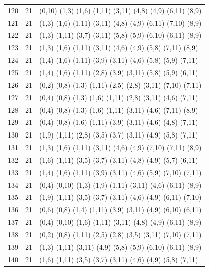 \begin{appendix}
{\begin{longtable}{lll}
    120& 21 & (0,10)  (1,3)   (1,6)   (1,11)  (3,11)  (4,8)   (4,9)   (6,11)  (8,9)\\
    121& 21 & (1,3)   (1,6)   (1,11)  (3,11)  (4,8)   (4,9)   (6,11)  (7,10)  (8,9)\\
    122& 21 & (1,3)   (1,11)  (3,7)   (3,11)  (5,8)   (5,9)   (6,10)  (6,11)  (8,9)\\
    123& 21 & (1,3)   (1,6)   (1,11)  (3,11)  (4,6)   (4,9)   (5,8)   (7,11)  (8,9)\\
    124& 21 & (1,4)   (1,6)   (1,11)  (3,9)   (3,11)  (4,6)   (5,8)   (5,9)   (7,11)\\
    125& 21 & (1,4)   (1,6)   (1,11)  (2,8)   (3,9)   (3,11)  (5,8)   (5,9)   (6,11)\\
    126& 21 & (0,2)   (0,8)   (1,3)   (1,11)  (2,5)   (2,8)   (3,11)  (7,10)  (7,11)\\
    127& 21 & (0,4)   (0,8)   (1,3)   (1,6)   (1,11)  (2,8)   (3,11)  (4,6)   (7,11)\\
    128& 21 & (0,4)   (0,8)   (1,3)   (1,6)   (1,11)  (3,11)  (4,6)   (7,11)  (8,9)\\
    129& 21 & (0,4)   (0,8)   (1,6)   (1,11)  (3,9)   (3,11)  (4,6)   (4,8)   (7,11)\\
    130& 21 & (1,9)   (1,11)  (2,8)   (3,5)   (3,7)   (3,11)  (4,9)   (5,8)   (7,11)\\
    131& 21 & (1,3)   (1,6)   (1,11)  (3,11)  (4,6)   (4,9)   (7,10)  (7,11)  (8,9)\\
    132& 21 & (1,6)   (1,11)  (3,5)   (3,7)   (3,11)  (4,8)   (4,9)   (5,7)   (6,11)\\
    133& 21 & (1,4)   (1,6)   (1,11)  (3,9)   (3,11)  (4,6)   (5,9)   (7,10)  (7,11)\\
    134& 21 & (0,4)   (0,10)  (1,3)   (1,9)   (1,11)  (3,11)  (4,6)   (6,11)  (8,9)\\
    135& 21 & (1,9)   (1,11)  (3,5)   (3,7)   (3,11)  (4,6)   (4,9)   (6,11)  (7,10)\\
    136& 21 & (0,6)   (0,8)   (1,4)   (1,11)  (3,9)   (3,11)  (4,9)   (6,10)  (6,11)\\
    137& 21 & (0,4)   (0,10)  (1,6)   (1,11)  (3,11)  (4,8)   (4,9)   (6,11)  (8,9)\\
    138& 21 & (0,2)   (0,8)   (1,11)  (2,5)   (2,8)   (3,5)   (3,11)  (7,10)  (7,11)\\
    139& 21 & (1,3)   (1,11)  (3,11)  (4,9)   (5,8)   (5,9)   (6,10)  (6,11)  (8,9)\\
    140& 21 & (1,6)   (1,11)  (3,5)   (3,7)   (3,11)  (4,6)   (4,9)   (5,8)   (7,11)\\

\end{longtable}}
\end{appendix}
